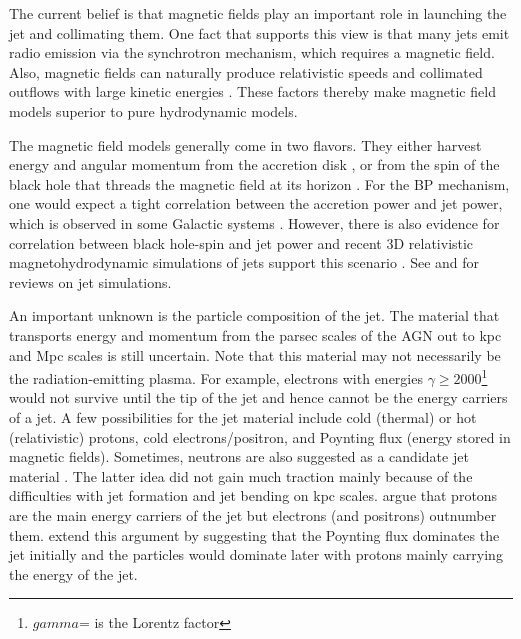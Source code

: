 The current belief is that magnetic fields play an important role in launching the jet and collimating them. One fact that supports this view is that many jets emit radio emission via the synchrotron mechanism, which requires a magnetic field. Also, magnetic fields can naturally produce relativistic speeds and collimated outflows with large kinetic energies \citep[e.g.,][]{heinz2000jet}. These factors thereby make magnetic field models superior to pure hydrodynamic models. 

The magnetic field models generally come in two flavors. They either harvest energy and angular momentum from the accretion disk \citep[e.g.,][BP]{blandford1982hydromagnetic}, or from the spin of the black hole that threads the magnetic field at its horizon \citep[e.g.,][BZ]{blandford1977electromagnetic}. For the BP mechanism, one would expect a tight correlation between the accretion power and jet power, which is observed in some Galactic systems \citep[e.g.,][]{willott1999emission}. However, there is also evidence for correlation between black hole-spin and  jet power \citep[e.g.,][]{mcclintock2013black} and recent 3D relativistic magnetohydrodynamic simulations of jets support this scenario \citep{tchekhovskoy2011efficient}.
See \citet{mckinney2006general} and \citet{marti2019numerical} for reviews on jet simulations. 


An important unknown is the particle composition of the jet. The material that transports energy and momentum from the parsec scales of the AGN out to kpc and Mpc scales is still uncertain. Note that this material may not necessarily be the radiation-emitting plasma. For example, electrons with energies $\gamma\geq2000$\footnote{$gamma$= is the Lorentz factor} would not survive until the tip of the jet  \citep{2007RMxAC..27..188H} and hence cannot be the energy carriers of a jet. A few possibilities for the jet material include cold (thermal) or hot (relativistic) protons, cold electrons/positron, and Poynting flux (energy stored in magnetic fields).  Sometimes, neutrons are also suggested as a candidate jet material \citep{dermer2004nonthermal}. The latter idea did not gain much traction mainly because of the difficulties with jet formation and jet bending on kpc scales. \citet{sikora2000pair} argue that protons are the main energy carriers of the jet but electrons (and positrons) outnumber them. \citep{sikora2005quasar} extend this argument by suggesting that the Poynting flux dominates the jet initially and the particles would dominate later with protons mainly carrying the energy of the jet.

